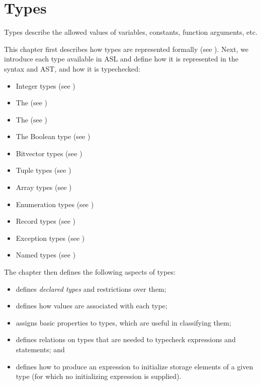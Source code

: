 \chapter{Types\label{chap:Types}}

Types describe the allowed values of variables, constants, function arguments, etc.

This chapter first describes how types are represented formally (see ).
Next, we introduce each type available in ASL and define
how it is represented in the syntax and AST, and how it is typechecked:
\begin{itemize}
  \item Integer types (see )
  \item The \realtypeterm{} (see )
  \item The \stringtypeterm{} (see )
  \item The Boolean type (see )
  \item Bitvector types (see )
  \item Tuple types (see )
  \item Array types (see )
  \item Enumeration types (see )
  \item Record types (see )
  \item Exception types (see )
  \item Named types (see )
\end{itemize}

The chapter then defines the following aspects of types:
\begin{itemize}
\item {} defines \emph{declared types} and restrictions over them;
\item {} defines how values are associated with each type;
\item {} assigns basic properties to types, which are useful
in classifying them;
\item {} defines relations on types that are needed to typecheck
expressions and statements; and
\item {} defines how to produce an expression to initialize storage
      elements of a given type (for which no initializing expression is supplied).
\end{itemize}

